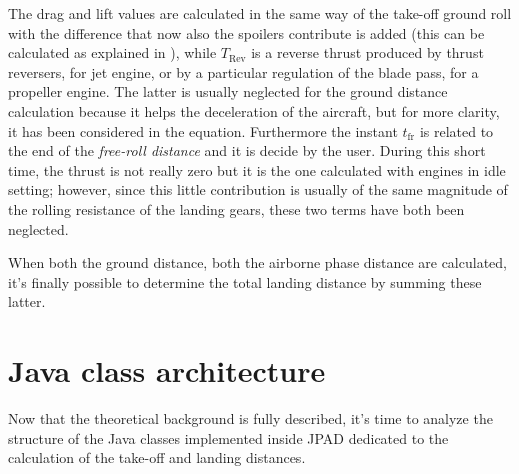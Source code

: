 %
The drag and lift values are calculated in the same way of the take-off ground roll with the difference that now also the spoilers contribute is added (this can be calculated as explained in \cite{Lausetti:decollo}), while $T_{\text{Rev}}$ is a reverse thrust produced by thrust reversers, for jet engine, or by a particular regulation of the blade pass, for a propeller engine. The latter is usually neglected for the ground distance calculation because it helps the deceleration of the aircraft, but for more clarity, it has been considered in the equation. Furthermore the instant $t_{\text{fr}}$ is related to the end of the \emph{free-roll distance} and it is decide by the user. During this short time, the thrust is not really zero but it is the one calculated with engines in idle setting; however, since this little contribution is usually of the same magnitude of the rolling resistance of the landing gears, these two terms have both been neglected.

\bigskip
\noindent
When both the ground distance, both the airborne phase distance are calculated, it's finally possible to determine the total landing distance by summing these latter.
\section{Java class architecture}
%
Now that the theoretical background is fully described, it's time to analyze the structure of the Java classes implemented inside \gls{JPAD} dedicated to the calculation of the take-off and landing distances.
%
